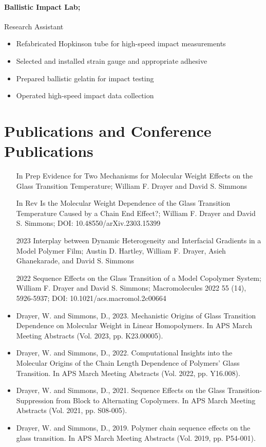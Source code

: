 \documentclass{my_cv}
\begin{document}
\paragraph{Ballistic Impact Lab;}
Research Assistant
\begin{itemize}
    \item Re\-fabricated Hopkins\-on tube for high-speed impact measurements
    \item Selected and installed strain gauge and appropriate adhesive
    \item Prepared ballistic gelatin for impact testing
    \item Operated high-speed impact data collection
\end{itemize}

\section{Publications and Conference Publications}
\begin{itemize}
    \item[In Prep] Evidence for Two Mechanisms for Molecular Weight Effects on the Glass Transition Temperature; William F. Drayer and David S. Simmons
    \item[In Rev] Is the Molecular Weight Dependence of the Glass Transition Temperature Caused by a Chain End Effect?; William F. Drayer and David S. Simmons; DOI: 10.48550/arXiv.2303.15399
    \item[2023] Interplay between Dynamic Heterogeneity and Inter\-facial Gradients in a Model Polymer Film; Austin D. Hartley, William F. Drayer, Asieh Ghanekarade, and David S. Simmons
    \item[2022] Sequence Effects on the Glass Transition of a Model Co\-polymer System; William F. Drayer and David S. Simmons; Macromolecules 2022 55 (14), 5926-5937; DOI: 10.1021/acs.macromol.2c00664
\end{itemize}

\begin{itemize}
    \item Drayer, W. and Simmons, D., 2023. Mechanistic Origins of Glass Transition Dependence on Molecular Weight in Linear Homopolymers. In APS March Meeting Abstracts (Vol. 2023, pp. K23.00005).
    \item Drayer, W. and Simmons, D., 2022. Computational Insights into the Molecular Origins of the Chain Length Dependence of Polymers' Glass Transition. In APS March Meeting Abstracts (Vol. 2022, pp. Y16.008).
    \item Drayer, W. and Simmons, D., 2021. Sequence Effects on the Glass Transition-Suppression from Block to Alternating Co\-polymers. In APS March Meeting Abstracts (Vol. 2021, pp. S08-005).
    \item Drayer, W. and Simmons, D., 2019. Polymer chain sequence effects on the glass transition. In APS March Meeting Abstracts (Vol. 2019, pp. P54-001).
\end{itemize}
\end{document}
